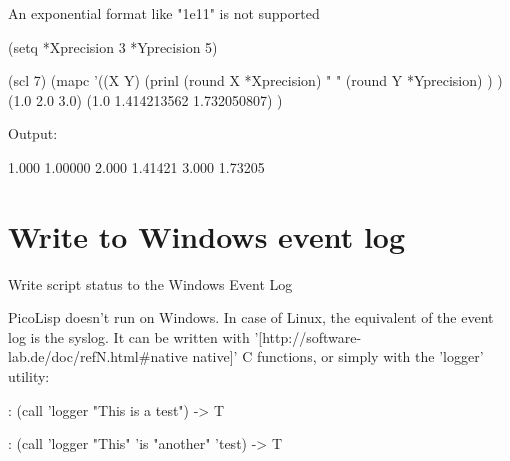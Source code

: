 \begin{wideverbatim}

An exponential format like "1e11" is not supported

(setq *Xprecision 3  *Yprecision 5)

(scl 7)
(mapc
   '((X Y)
      (prinl
         (round X *Xprecision)
         "  "
         (round Y *Yprecision) ) )
   (1.0 2.0 3.0)
   (1.0 1.414213562 1.732050807) )

Output:

1.000  1.00000
2.000  1.41421
3.000  1.73205

\end{wideverbatim}

\pagebreak{}
\section*{Write to Windows event log}

Write script status to the Windows Event Log

\begin{wideverbatim}

PicoLisp doesn't run on Windows. In case of Linux, the equivalent of the event
log is the syslog. It can be written with
'[http://software-lab.de/doc/refN.html#native native]' C functions, or simply
with the 'logger' utility:

: (call 'logger "This is a test")
-> T

: (call 'logger "This" 'is "another" 'test)
-> T

\end{wideverbatim}



% 
